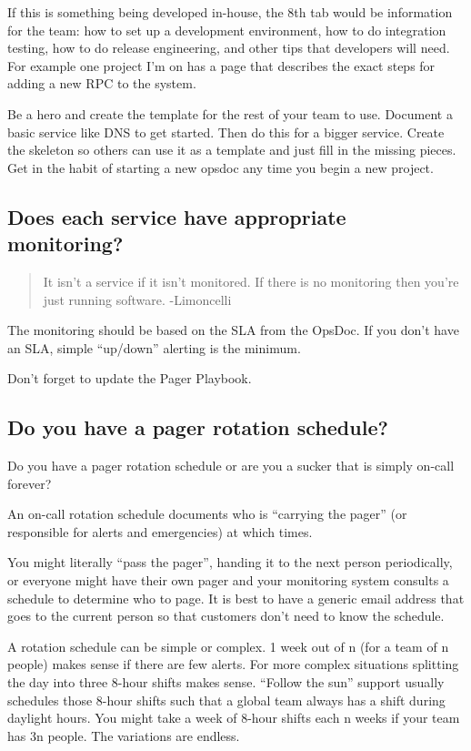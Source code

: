 \documentclass{article}
\begin{document}
If this is something being developed in-house, the 8th tab would be information for the team: how to set up a development environment, how to do integration testing, how to do release engineering, and other tips that developers will need. For example one project I'm on has a page that describes the exact steps for adding a new RPC to the system.

Be a hero and create the template for the rest of your team to use. Document a basic service like DNS to get started. Then do this for a bigger service. Create the skeleton so others can use it as a template and just fill in the missing pieces. Get in the habit of starting a new opsdoc any time you begin a new project.

\subsection{Does each service have appropriate monitoring? \Checkmark}
\begin{quote}
	It isn't a service if it isn't monitored. If there is no monitoring then you're just running software. -Limoncelli
\end{quote}

The monitoring should be based on the SLA from the OpsDoc. If you don't have an SLA, simple ``up/down'' alerting is the minimum.

Don't forget to update the Pager Playbook.

\subsection{Do you have a pager rotation schedule? \Checkmark}
Do you have a pager rotation schedule or are you a sucker that is simply on-call forever?

An on-call rotation schedule documents who is ``carrying the pager'' (or responsible for alerts and emergencies) at which times.

You might literally ``pass the pager'', handing it to the next person periodically, or everyone might have their own pager and your monitoring system consults a schedule to determine who to page. It is best to have a generic email address that goes to the current person so that customers don't need to know the schedule.

A rotation schedule can be simple or complex. 1 week out of n (for a team of n people) makes sense if there are few alerts. For more complex situations splitting the day into three 8-hour shifts makes sense. ``Follow the sun'' support usually schedules those 8-hour shifts such that a global team always has a shift during daylight hours. You might take a week of 8-hour shifts each n weeks if your team has 3n people. The variations are endless.
\end{document}
